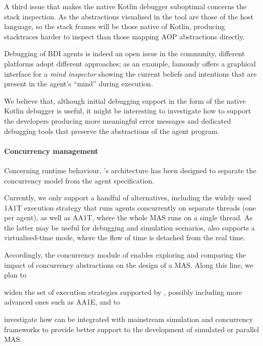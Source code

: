 A third issue that makes the native Kotlin debugger suboptimal concerns the stack inspection.
%
As the abstractions visualised in the tool are those of the host language,
so the stack frames will be those native of Kotlin,
producing stacktraces harder to inspect than those mapping \ac{AOP} abstractions directly.

Debugging of BDI agents is indeed an open issue in the community,
different platforms adopt different approaches;
as an example, \jason{} famously offers a graphical interface
for a \textit{mind inspector}
showing the current beliefs and intentions that are
present in the agent's ``mind'' during execution.

We believe that,
although initial debugging support
in the form of the native Kotlin debugger is useful,
it might be interesting to investigate how to support the developers
producing more meaningful error messages and dedicated debugging tools
that preserve the abstractions of the agent program.

\paragraph{Concurrency management}

Concerning runtime behaviour,
\jakta{}'s architecture has been designed to separate the concurrency model
from the agent specification.

Currently, we only support a handful of alternatives,
including the widely used \acs{1A1T} execution strategy that runs
agents concurrently on separate threads (one per agent),
as well as \acs{AA1T}, where the whole MAS runs on a single thread.
%
As the latter may be useful for debugging and simulation scenarios,
\jakta{} also supports a virtualised-time mode,
where the flow of time is detached from the real time.

Accordingly,
the concurrency module of \jakta{} enables exploring and comparing the impact of concurrency abstractions
on the design of a \ac{MAS}.
%
Along this line, we plan to
%
\begin{inlinelist}
    \item  widen the set of execution strategies supported by \jakta{},
    possibly including more advanced ones such as \acs{AA1E},
    and to
    \item investigate how \jakta{} can be integrated with mainstream simulation and concurrency frameworks
    to provide better support to the development of simulated or parallel \ac{MAS}.
\end{inlinelist}

